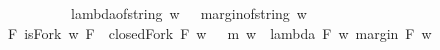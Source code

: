 \begin{isabellebody}
\ \ \ \ \ \ \ \ \ \ {\isacharequal}\ {\isacharparenleft}lambda{\isacharunderscore}of{\isacharunderscore}string\ w\ {\isacharminus}\ {}{\isacharcomma}\ margin{\isacharunderscore}of{\isacharunderscore}string\ w\ {\isacharminus}\ {}{\isacharparenright}{\isacharparenright}{\isacharparenright}{\isacharparenright}{\isacharparenright}\ \isanewline
{\isasymand}\ {\isacharparenleft}{\isasymexists}\ F{\isachardot}\ {\isacharparenleft}isFork\ w\ F\ {\isasymand}\ closedFork\ F\ w\ \ {\isasymand}\ {\isacharparenleft}m\ w\ {\isacharequal}\ {\isacharparenleft}lambda\ F\ w{\isacharcomma}\ margin\ F\ w{\isacharparenright}{\isacharparenright}{\isacharparenright}{\isacharparenright}{\isacharparenright}{\isachardoublequoteclose}\isanewline
%
\isadelimproof
\ \ %
\endisadelimproof
%
\isatagproof
{}\isamarkupfalse%
%
\endisatagproof
{\isafoldproof}%
%
\isadelimproof
\isanewline
%
\endisadelimproof
%
\isadelimtheory
\ \ \ \ \isanewline
%
\endisadelimtheory
%
\isatagtheory
{}\isamarkupfalse%
%
\endisatagtheory
{\isafoldtheory}%
%
\isadelimtheory
%
\endisadelimtheory
%
\end{isabellebody}%
